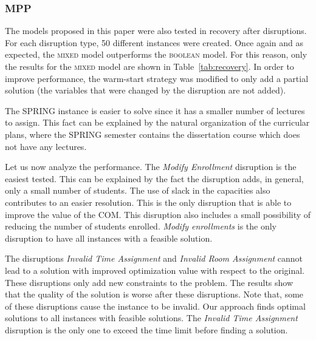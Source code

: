 \documentclass[runningheads]{llncs}
\begin{document}
\vspace{-0.6cm}

\subsubsection{MPP}

The models proposed in this paper were also tested in recovery after disruptions. For each disruption type, 50 different instances were created. Once again and as expected, the \textsc{mixed} model outperforms the \textsc{boolean} model. For this reason, only the results for the \textsc{mixed} model are shown in Table~\ref{tab:recovery}. In order to improve performance, the warm-start strategy was modified to only add a partial solution (the variables that were changed by the disruption are not added).

The \textsc{SPRING} instance is easier to solve since it has a smaller number of lectures to assign. This fact can be explained by the natural organization of the curricular plans, where the \textsc{SPRING} semester contains the dissertation course which does not have any lectures. 

Let us now analyze the performance. The \textit{Modify Enrollment} disruption is the easiest tested. This can be explained by the fact the disruption adds, in general, only a small number of students. The use of slack in the capacities also contributes to an easier resolution. This is the only disruption that is able to improve the value of the COM. This disruption also includes a small possibility of reducing the number of students enrolled. \textit{Modify enrollments} is the only disruption to have all instances with a feasible solution. 

The disruptions \textit{Invalid Time Assignment} and \textit{Invalid Room Assignment} cannot lead to a solution with improved optimization value with respect to the original. These disruptions only add new constraints to the problem. The results show that the quality of the solution is worse after these disruptions. Note that, some of these disruptions cause the instance to be invalid. Our approach finds optimal solutions to all instances with feasible solutions. The \textit{Invalid Time Assignment} disruption is the only one to exceed the time limit before finding a solution. 

\end{document}
